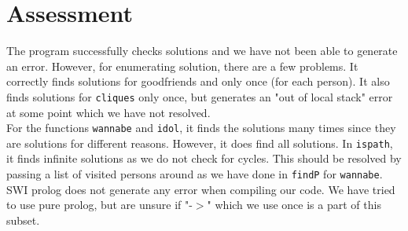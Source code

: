 \documentclass[a4paper]{article}
\begin{document}
\section*{Assessment}
The program successfully checks solutions and we have not been able to generate an error. However, for enumerating solution, there are a few problems. It correctly finds solutions for {goodfriends} and only once (for each person). It also finds solutions for \texttt{cliques} only once, but generates an "out of local stack" error at some point which we have not resolved. \\
For the functions \texttt{wannabe} and \texttt{idol}, it finds the solutions many times since they are solutions for different reasons. However, it does find all solutions. In \texttt{ispath}, it finds infinite solutions as we do not check for cycles. This should be resolved by passing a list of visited persons around as we have done in \texttt{findP} for \texttt{wannabe}.\\
SWI prolog does not generate any error when compiling our code. We have tried to use pure prolog, but are unsure if "-$>$" which we use once is a part of this subset.
\end{document}
